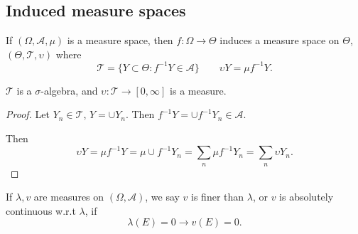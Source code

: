 
\subsection{Induced measure spaces}

If $(\Omega, \mathcal{A}, \mu)$ is a measure space, then $f: \Omega \to \Theta$ induces a measure space on $\Theta$, $(\Theta, \mathcal{T}, \upsilon)$ where
\[
	\mathcal{T} = \{Y \subset \Theta : f^{-1} Y \in \mathcal{A}\} \qquad \upsilon Y = \mu f^{-1} Y
.\] 

\begin{proposition}
	$\mathcal{T}$ is a $\sigma$-algebra, and $\upsilon : \mathcal{T} \to  [0,\infty ]$ is a measure.
\end{proposition}
\begin{proof}
	Let $Y_n \in \mathcal{T}$, $Y = \cup  Y_n$. Then $f^{-1}  Y = \cup f^{-1} Y_n \in \mathcal{A}$.

	Then
	\[
		\upsilon Y = \mu f^{-1} Y = \mu \cup f^{-1} Y_n = \sum_n \mu f^{-1} Y_n = \sum _n \upsilon Y_n
	.\] 
\end{proof}


\begin{definition}
If $\lambda, v$ are measures on $(\Omega, \mathcal{A})$, we say $v$ is finer than $\lambda$, or $v$ is absolutely continuous w.r.t $\lambda$, if
 \[
	\lambda(E) = 0 \to v(E) = 0
.\] 
\end{definition}


